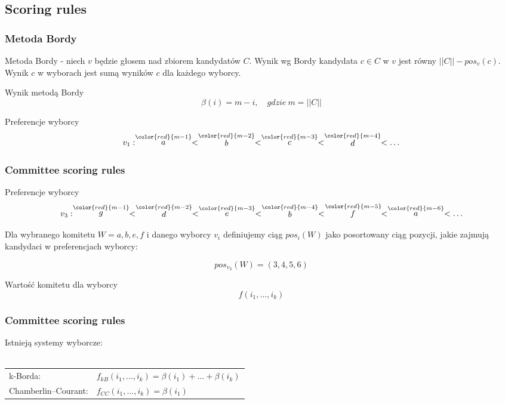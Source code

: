 \documentclass{beamer}
\newcommand{\red}[1]{
	{ \color{red}{#1} }
}
\newcommand{\score}[2]{
	\stackrel
	{\red{#1}}
	{#2}
}
\begin{document}
\subsection{Scoring rules}

\begin{frame}
\frametitle{Metoda Bordy}

Metoda Bordy -
niech $v$ będzie głosem nad zbiorem kandydatów $C$.
Wynik wg Bordy kandydata $c \in C$ w $v$ jest równy
$ ||C|| - pos_v(c) $.
Wynik $c$ w wyborach jest sumą wyników $c$ dla każdego wyborcy.

\begin{exampleblock}{Wynik metodą Bordy}
$$
\beta(i) = m-i, \quad gdzie \ m = ||C||
$$
\end{exampleblock}

\begin{exampleblock}{Preferencje wyborcy}
$$ 
v_1: \score{m-1}{a} < \score{m-2}{b} < \score{m-3}{c} < \score{m-4}{d} < \ldots
$$
\end{exampleblock}

\end{frame}


\begin{frame}
\frametitle{Committee scoring rules}

\begin{exampleblock}{Preferencje wyborcy}
$$
v_3: \score{m-1}{g} < \score{m-2}{d} < \score{m-3}{e} < \score{m-4}{b} < \score{m-5}{f} < \score{m-6}{a} < \ldots
$$
\end{exampleblock}

Dla wybranego komitetu $W = {a, b, e, f}$ i danego
wyborcy $v_i$ definiujemy ciąg $ pos_i(W) $ jako
posortowany ciąg pozycji, jakie zajmują kandydaci w preferencjach wyborcy:

$$pos_{v_3}(W) = (3, 4, 5, 6)$$

\begin{exampleblock}{Wartość komitetu dla wyborcy}
$$
f(i_1, \ldots, i_k)
$$
\end{exampleblock}

\end{frame}


\begin{frame}
\frametitle{Committee scoring rules}

Istnieją systemy wyborcze: \\ ~ \\

\begin{tabular}{ll}
k-Borda: 			& $f_{kB}(i_1, \ldots, i_k) = \beta(i_1) + \ldots + \beta(i_k)$\\
Chamberlin–Courant:  & $f_{CC}(i_1, \ldots, i_k) = \beta(i_1)$
\end{tabular}

\end{frame}
\end{document}
